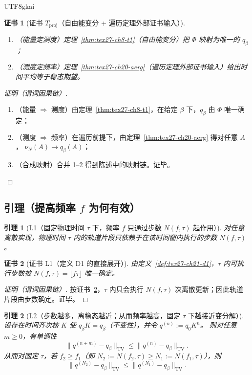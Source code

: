 \documentclass[12pt]{article}
\newtheorem{lemma}{引理}[section]
\newtheorem{Certificate}{证书}[section]
\begin{document}
\begin{CJK*}{UTF8}{gkai}
\begin{Certificate}[证书 $T_{\mathrm{proj}}$（自由能变分 + 遍历定理外部证书输入）]
\label{cert:tex27-ch21-tproj}
\begin{enumerate}
  \item（能量定测度）定理~\ref{thm:tex27-ch8-t1}（自由能变分）把 $\Phi$ 映射为唯一的 $q_\beta$；
  \item（测度定频率）定理~\ref{thm:tex27-ch20-aerg}（遍历定理外部证书输入）给出时间平均等于稳态期望。
\end{enumerate}
\end{Certificate}

\begin{proof}[证明（谓词因果链）]
\begin{enumerate}
  \item（能量 $\Rightarrow$ 测度）由定理~\ref{thm:tex27-ch8-t1}，在给定 $\beta$ 下，$q_\beta$ 由 $\Phi$ 唯一确定；
  \item（测度 $\Rightarrow$ 频率）在遍历前提下，由定理~\ref{thm:tex27-ch20-aerg} 得对任意 $A$，
  $\nu_N(A)\to q_\beta(A)$；
  \item（合成映射）合并 1--2 得到陈述中的映射链。证毕。
\end{enumerate}
\end{proof}

\subsection{引理（提高频率 $f$ 为何有效）}
\label{subsec:tex27-ch21-lemmas}

\begin{lemma}[L1（固定物理时间 $\tau$ 下，频率 $f$ 只通过步数 $N(f,\tau)$ 起作用）]
\label{lem:tex27-ch21-l1}
对任意离散实现，物理时间 $\tau$ 内的轨道片段只依赖于在该时间窗内执行的步数 $N(f,\tau)$。
\end{lemma}

\begin{Certificate}[证书 L1（定义 D1 的直接展开）]
\label{cert:tex27-ch21-l1}
由定义~\ref{def:tex27-ch21-d1}，$\tau$ 内可执行步数被 $N(f,\tau)=\lfloor f\tau\rfloor$ 唯一确定。
\end{Certificate}

\begin{proof}[证明（谓词因果链）]
按证书~\ref{cert:tex27-ch21-l1}，$\tau$ 内只会执行 $N(f,\tau)$ 次离散更新；因此轨道片段由步数确定。证毕。
\end{proof}

\begin{lemma}[L2（步数越多，离稳态越近；从而频率越高，固定 $\tau$ 下越接近变分解）]
\label{lem:tex27-ch21-l2}
设存在时间齐次核 $K$ 使 $q_\beta K=q_\beta$（不变性），并令 $q^{(n)}:=q_0K^n$。
则对任意 $m\ge 0$，有单调性
\[
  \|q^{(n+m)}-q_\beta\|_{\mathrm{TV}}\le \|q^{(n)}-q_\beta\|_{\mathrm{TV}}.
\]
从而对固定 $\tau$，若 $f_2\ge f_1$（即 $N_2:=N(f_2,\tau)\ge N_1:=N(f_1,\tau)$），则
\[
  \|q^{(N_2)}-q_\beta\|_{\mathrm{TV}}\le \|q^{(N_1)}-q_\beta\|_{\mathrm{TV}}.
\]
\end{lemma}


\end{CJK*}
\end{document}
